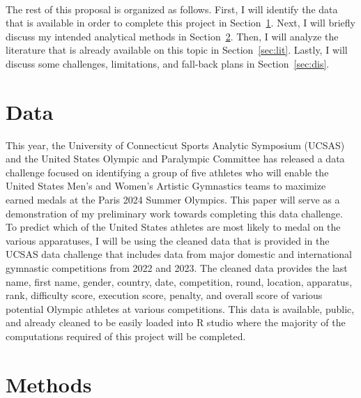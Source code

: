 \documentclass[12pt]{article}
\begin{document}
\\

The rest of this proposal is organized as follows. First, I will identify the data that is available
 in order to complete this project in Section~\ref{sec:data}. Next, I will briefly discuss my intended 
 analytical methods in Section~\ref{sec:meth}. Then, I will analyze the literature that is already 
 available on this topic in Section~\ref{sec:lit}. Lastly, I will discuss some challenges, limitations, and 
 fall-back plans in Section~\ref{sec:dis}.

\section{Data}
\label{sec:data}

This year, the University of Connecticut Sports Analytic Symposium (UCSAS) and the United States 
Olympic and Paralympic Committee has released a data challenge focused on identifying a group of 
five athletes who will enable the United States Men's and Women's Artistic Gymnastics teams to 
maximize earned medals at the Paris 2024 Summer Olympics. This paper will serve as a demonstration
of my preliminary work towards completing this data challenge. To predict which of the United States 
athletes are most likely to medal on the various apparatuses, I will be using the cleaned data that 
is provided in the UCSAS data challenge that includes data from major domestic and international 
gymnastic competitions from 2022 and 2023. The cleaned data provides the last name, first name, gender, 
country, date, competition, round, location, apparatus, rank, difficulty score, execution score, penalty, 
and overall score of various potential Olympic athletes at various competitions. This data is available, 
public, and already cleaned to be easily loaded into R studio where the majority of the computations 
required of this project will be completed.

\section{Methods}
\label{sec:meth}
\end{document}
